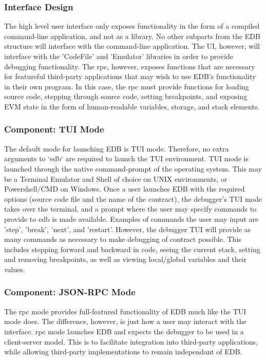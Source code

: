 \documentclass{report}
\begin{document}
\subsubsection{Interface Design}
    The high level user interface only exposes functionality in the form of a compiled command-line application, and not as a library. No other subparts from the EDB structure will interface with the command-line application. The UI, however, will interface with the 'CodeFile' and 'Emulator' libraries in order to provide debugging functionality. The \Gls{rpc}, however, exposes functions that are necessary for featureful third-party applications that may wish to use EDB's functionality in their own program. In this case, the \Gls{rpc} must provide functions for loading source code, stepping through source code, setting breakpoints, and exposing EVM state in the form of human-readable variables, storage, and stack elements.

\subsubsection{Component: TUI Mode}
    The default mode for launching EDB is TUI mode. Therefore, no extra arguments to `edb` are required to launch the TUI environment. TUI mode is launched through the native command-prompt of the operating system. This may be a Terminal Emulator and Shell of choice on UNIX environments, or Powershell/CMD on Windows. Once a user launches EDB with the required options (source code file and the name of the contract), the debugger's TUI mode takes over the terminal, and a prompt where the user may specify commands to provide to edb is made available. Examples of commands the user may input are 'step', 'break', 'next', and 'restart'. However, the debugger TUI will provide as many commands as necessary to make debugging of \gls{contract} possible. This includes stepping forward and backward in code, seeing the current stack, setting and removing breakpoints, as well as viewing local/global variables and their values.

\subsubsection{Component: JSON-RPC Mode}
    The \Gls{rpc} mode provides full-featured functionality of EDB much like the TUI mode does. The difference, however, is just how a user may interact with the interface. \Gls{rpc} mode launches EDB and expects the debugger to be used in a client-server model. This is to facilitate integration into third-party applications, while allowing third-party implementations to remain independant of EDB.
\end{document}
